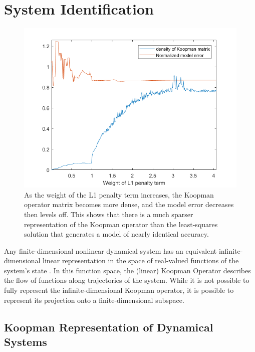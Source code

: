 \section{System Identification}
\label{sec:sysid}

\begin{figure}
    \centering
    \includegraphics[width=\linewidth]{figures/lasso_placeholder.png}
    \caption{As the weight of the L1 penalty term increases, the Koopman operator matrix becomes more dense, and the model error decreases then levels off. This shows that there is a much sparser representation of the Koopman operator than the least-squares solution that generates a model of nearly identical accuracy.}
    \label{fig:lasso}
\end{figure}


Any finite-dimensional nonlinear dynamical system has an equivalent infinite-dimensional linear representation in the space of real-valued functions of the system's state \cite{}.
In this function space, the (linear) Koopman Operator describes the flow of functions along trajectories of the system.
While it is not possible to fully represent the infinite-dimensional Koopman operator, it is possible to represent its projection onto a finite-dimensional subspace.

\subsection{Koopman Representation of Dynamical Systems}

